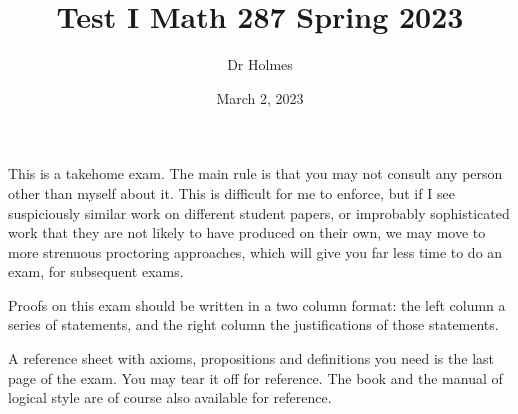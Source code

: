 \documentclass[12pt]{article}
\title{Test I Math 287 Spring 2023}
\author{Dr Holmes}
\date{March 2, 2023}
\begin{document}
\maketitle

This is a takehome exam. The main rule is that you may not consult any person other than myself about it.  This is difficult for me to enforce, but if I see
suspiciously similar work on different student papers, or improbably sophisticated work that they are not likely to have produced on their own, we may move to more strenuous proctoring approaches, which will give you far less time to do an exam, for subsequent exams.

Proofs on this exam should be written in a two column format:  the left column a series of statements, and the right column the justifications of those statements.

A reference sheet with axioms, propositions and definitions you need is the last page of the exam.  You may tear it off for reference.  The book and the manual of logical style are of course also available for reference.



\newpage
\end{document}

